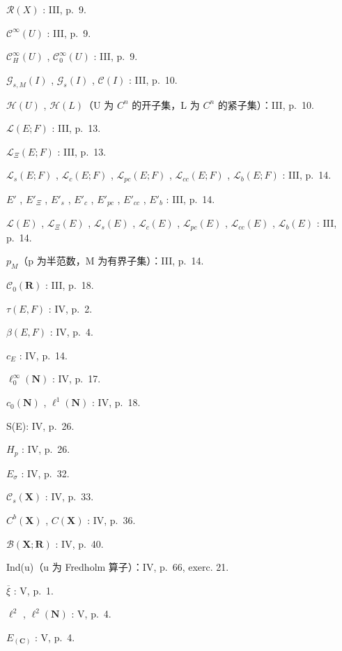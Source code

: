\(\mathcal{R}(X)\) : III, p.~9.

\(\mathcal{C}^{\infty}(U)\) : III, p.~9.

\(\mathcal{C}_{H}^{\infty}(U)\) , \(\mathcal{C}_{0}^{\infty}(U)\) : III, p.~9.

\(\mathcal{G}_{s,M}(I)\) , \(\mathcal{G}_{s}(I)\) , \(\mathcal{C}(I)\) : III, p.~10.

\(\mathcal{H}(U)\) , \(\mathcal{H}(L)\)（U 为 \(C^{n}\) 的开子集，L 为 \(C^{n}\) 的紧子集）：III, p.~10.

\(\mathcal{L}(E; F)\) : III, p.~13.

\(\mathcal{L}_{\Xi}(E; F)\) : III, p.~13.

\(\mathcal{L}_{s}(E; F)\) , \(\mathcal{L}_{c}(E; F)\) , \(\mathcal{L}_{pc}(E; F)\) , \(\mathcal{L}_{cc}(E; F)\) , \(\mathcal{L}_{b}(E; F)\) : III, p.~14.

\(E'\) , \(E'_{\Xi}\) , \(E'_{s}\) , \(E'_{c}\) , \(E'_{pc}\) , \(E'_{cc}\) , \(E'_{b}\) : III, p.~14.

\(\mathcal{L}(E)\) , \(\mathcal{L}_{\Xi}(E)\) , \(\mathcal{L}_{s}(E)\) , \(\mathcal{L}_{c}(E)\) , \(\mathcal{L}_{pc}(E)\) , \(\mathcal{L}_{cc}(E)\) , \(\mathcal{L}_{b}(E)\) : III, p.~14.

\(p_{M}\)（p 为半范数，M 为有界子集）：III, p.~14.

\(\mathcal{C}_{0}(\mathbf{R})\) : III, p.~18.

\(\tau(E, F)\) : IV, p.~2.

\(\beta(E, F)\) : IV, p.~4.

\(c_{E}\) : IV, p.~14.

\(\ell_{0}^{\infty}(\mathbf{N})\) : IV, p.~17.

\(c_{0}(\mathbf{N})\) , \(\ell^{1}(\mathbf{N})\) : IV, p.~18.

S(E): IV, p.~26.

\(H_{p}\) : IV, p.~26.

\(E_{\sigma}\) : IV, p.~32.

\(\mathcal{C}_{s}(\mathbf{X})\) : IV, p.~33.

\(C^{b}(\mathbf{X})\) , \(C(\mathbf{X})\) : IV, p.~36.

\(\mathcal{B}(\mathbf{X};\mathbf{R})\) : IV, p.~40.

Ind(u)（u 为 Fredholm 算子）：IV, p.~66, exerc. 21.

\(\overline{\xi}\) : V, p.~1.

\(\ell^{2}\) , \(\ell^{2}(\mathbf{N})\) : V, p.~4.

\(E_{(\mathbf{C})}\) : V, p.~4.

